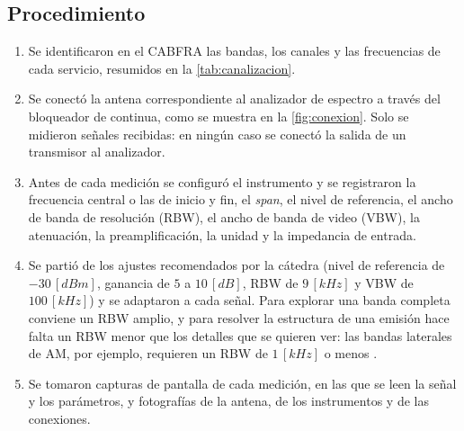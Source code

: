 \subsection{Procedimiento}
\begin{enumerate}
    \item Se identificaron en el CABFRA \cite{cabfra} las bandas, los canales y las frecuencias de cada servicio, resumidos en la \autoref{tab:canalizacion}.
    \item Se conectó la antena correspondiente al analizador de espectro a través del bloqueador de continua, como se muestra en la \autoref{fig:conexion}. Solo se midieron señales recibidas: en ningún caso se conectó la salida de un transmisor al analizador.
    \item Antes de cada medición se configuró el instrumento y se registraron la frecuencia central o las de inicio y fin, el \textit{span}, el nivel de referencia, el ancho de banda de resolución (RBW), el ancho de banda de video (VBW), la atenuación, la preamplificación, la unidad y la impedancia de entrada.
    \item Se partió de los ajustes recomendados por la cátedra (nivel de referencia de $-30 \, [dBm]$, ganancia de $5$ a $10 \, [dB]$, RBW de $9 \, [kHz]$ y VBW de $100 \, [kHz]$) y se adaptaron a cada señal. Para explorar una banda completa conviene un RBW amplio, y para resolver la estructura de una emisión hace falta un RBW menor que los detalles que se quieren ver: las bandas laterales de AM, por ejemplo, requieren un RBW de $1 \, [kHz]$ o menos \cite{keysight_sa}.
    \item Se tomaron capturas de pantalla de cada medición, en las que se leen la señal y los parámetros, y fotografías de la antena, de los instrumentos y de las conexiones.
\end{enumerate}

